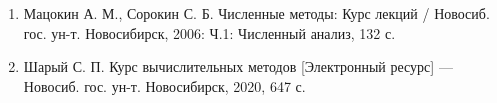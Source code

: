 \documentclass[../main.tex]{subfile}
\begin{document}
\begin{enumerate}[nosep]
	\item Мацокин А. М., Сорокин С. Б. Численные методы: Курс лекций /
		Новосиб. гос. ун-т. Новосибирск, 2006: Ч.1: Численный анализ,
		132 с.
	\item Шарый С. П. Курс вычислительных методов [Электронный ресурс] ---
		Новосиб. гос. ун-т. Новосибирск, 2020, 647 с.
\end{enumerate}
\end{document}
